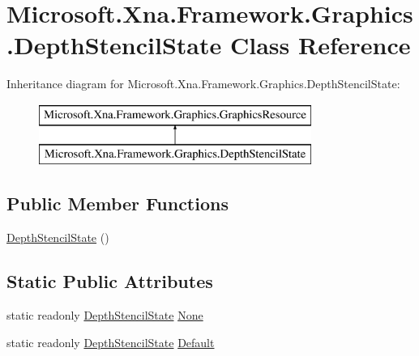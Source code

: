 \hypertarget{class_microsoft_1_1_xna_1_1_framework_1_1_graphics_1_1_depth_stencil_state}{}\section{Microsoft.\+Xna.\+Framework.\+Graphics.\+Depth\+Stencil\+State Class Reference}
\label{class_microsoft_1_1_xna_1_1_framework_1_1_graphics_1_1_depth_stencil_state}
Inheritance diagram for Microsoft.\+Xna.\+Framework.\+Graphics.\+Depth\+Stencil\+State\+:\begin{figure}[H]
\begin{center}
\leavevmode
\includegraphics[height=2.000000cm]{class_microsoft_1_1_xna_1_1_framework_1_1_graphics_1_1_depth_stencil_state}
\end{center}
\end{figure}
\subsection*{Public Member Functions}
\begin{DoxyCompactItemize}
\item 
\hyperlink{class_microsoft_1_1_xna_1_1_framework_1_1_graphics_1_1_depth_stencil_state_ad43b3dc78bc7ebab254f444eacdba5f3}{Depth\+Stencil\+State} ()
\end{DoxyCompactItemize}
\subsection*{Static Public Attributes}
\begin{DoxyCompactItemize}
\item 
static readonly \hyperlink{class_microsoft_1_1_xna_1_1_framework_1_1_graphics_1_1_depth_stencil_state}{Depth\+Stencil\+State} \hyperlink{class_microsoft_1_1_xna_1_1_framework_1_1_graphics_1_1_depth_stencil_state_ae18b482471863cf1d5194ad89420ad58}{None}
\item 
static readonly \hyperlink{class_microsoft_1_1_xna_1_1_framework_1_1_graphics_1_1_depth_stencil_state}{Depth\+Stencil\+State} \hyperlink{class_microsoft_1_1_xna_1_1_framework_1_1_graphics_1_1_depth_stencil_state_a562894c724fd435d762313d26b2f1b32}{Default}
\end{DoxyCompactItemize}
